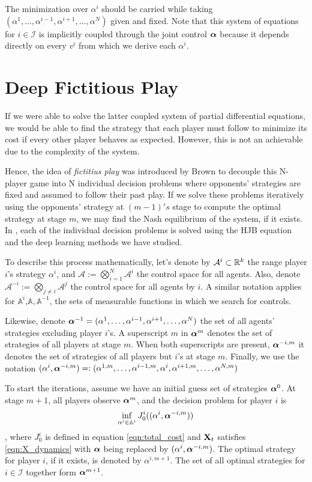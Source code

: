 The minimization over $\alpha^i$ should be carried while taking $(\alpha^1,\ldots,\alpha^{i-1},\alpha^{i+1},\ldots,\alpha^N)$ given and fixed. Note that this system of equations for $i\in\mathcal{I}$ is implicitly coupled through the joint control $\bm{\alpha}$ because it depends directly on every $v^i$ from which we derive each $\alpha^i$.

\section{Deep Fictitious Play}
If we were able to solve the latter coupled system of partial differential equations, we would be able to find the strategy that each player must follow to minimize its cost if every other player behaves as expected.  However, this is not an achievable due to the complexity of the system.

Hence, the idea of \textit{fictitius play} was introduced by Brown \cite{brown_notes_1949} to decouple this N-player game into N individual decision problems where opponents' strategies are fixed and assumed to follow their past play. If we solve these problems iteratively using the opponents' strategy  at $(m-1)'s$ stage to compute the optimal strategy at stage $m$, we may find the Nash equilibrium of the system, if it exists. In \cite{han_deep_2020}, each of the individual decision problems is solved using the HJB equation and the deep learning methods we have studied.  

To describe this process mathematically, let's denote by $\mathcal{A}^i\subset \mathbb{R}^k $ the range player $i$'s strategy $\alpha^i$, and $\mathcal{A}:=\bigotimes_{i=1}^{N}\mathcal{A}^i$ the control space for all agents. Also, denote $\mathcal{A}^{-i}:=\bigotimes_{j\neq i}\mathcal{A}^j$ the control space for all agents by $i$. A similar notation applies for $\mathbb{A}^i$,$\mathbb{A},\mathbb{A}^{-1}$, the sets of measurable functions in which we search for controls.

Likewise, denote $\bm{\alpha}^{-1}=(\alpha^1,\ldots,\alpha^{i-1},\alpha^{i+1},\ldots,\alpha^{N})$ the set of all agents' strategies excluding player $i$'s. A superscript $m$ in $\bm{\alpha}^m$ denotes the set of strategies of all players at stage $m$. When both superscripts are present, $\bm{\alpha}^{-i,m}$ it denotes the set of strategies of all players but $i$'s at stage $m$. Finally, we use the notation $(\alpha^i,\bm{\alpha}^{-i,m})=:(\alpha^{1,m},\ldots,\alpha^{i-1,m},\alpha^i,\alpha^{i+1,m},\ldots,\alpha^{N,m})$

To start the iterations, assume we have an initial guess set of strategies $\bm{\alpha}^0$. At stage $m+1$, all players observe $\bm{\alpha}^m$, and the decision problem for player $i$ is 
\begin{equation}
	\inf_{\alpha^i \in \mathbb{A}^i} J_0^i((\alpha^i,\bm{\alpha}^{-i,m}))
\end{equation},
where $J_0^i$ is defined in  equation \eqref{eqn:total_cost} and $\mathbf{X}_t$ satisfies \eqref{eqn:X_dynamics} with $\bm{\alpha}$ being replaced by $(\alpha^i,\bm{\alpha}^{-i,m})$. The optimal strategy for player $i$, if it exists, is denoted by $\alpha^{i,m+1}$. The set of all optimal strategies for $i\in\mathcal{I}$ together form $\bm{\alpha}^{m+1}$.


